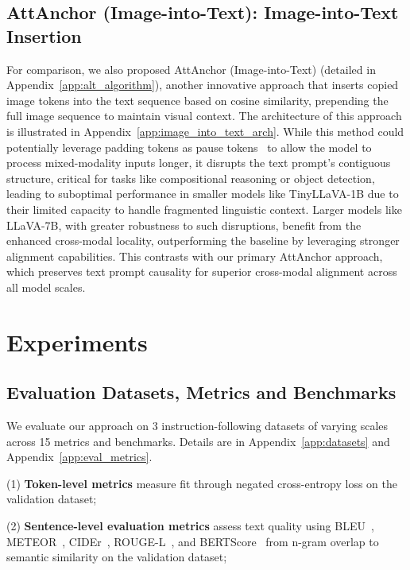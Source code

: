 \documentclass[11pt]{article}
\begin{document}
\subsection{AttAnchor (Image-into-Text): Image-into-Text Insertion}
For comparison, we also proposed AttAnchor (Image-into-Text) (detailed in Appendix~\ref{app:alt_algorithm}), 
another innovative approach that inserts copied image tokens into the text sequence based on cosine similarity, prepending the full image sequence to maintain visual context. The architecture of this approach is illustrated in Appendix~\ref{app:image_into_text_arch}. While this method could potentially leverage padding tokens as pause tokens~\citep{goyal2023think} to allow the model to process mixed-modality inputs longer, it disrupts the text prompt's contiguous structure, critical for tasks like compositional reasoning or object detection, leading to suboptimal performance in smaller models like TinyLLaVA-1B due to their limited capacity to handle fragmented linguistic context. Larger models like LLaVA-7B, with greater robustness to such disruptions, benefit from the enhanced cross-modal locality, outperforming the baseline by leveraging stronger alignment capabilities. This contrasts with our primary AttAnchor approach, which preserves text prompt causality for superior cross-modal alignment across all model scales.


\section{Experiments}

\subsection{Evaluation Datasets, Metrics and Benchmarks}

We evaluate our approach on 3 instruction-following datasets of varying scales across 15 metrics and  benchmarks. Details are in Appendix~\ref{app:datasets} and Appendix~\ref{app:eval_metrics}. 

(1) \textbf{Token-level metrics} measure fit through negated cross-entropy loss on the validation dataset;

(2) \textbf{Sentence-level evaluation metrics} assess text quality using BLEU~\citep{papineni2002bleu}, METEOR~\citep{banerjee2005meteor}, CIDEr~\citep{vedantam2015cider}, ROUGE-L~\citep{lin2004rouge}, and BERTScore~\citep{zhang2019bertscore} from n-gram overlap to semantic similarity on the validation dataset; 
\end{document}
